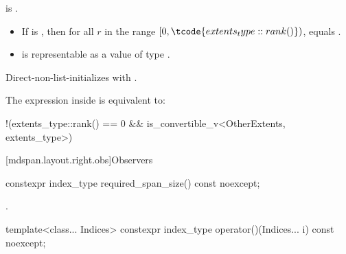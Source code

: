 \begin{itemdescr}
\pnum
\constraints
{} is .

\pnum
\expects
\begin{itemize}
\item
If  is ,
then for all $r$ in the range $[0, \tcode{extents_type::rank()})$,
 equals
.
\item
{} is representable as
a value of type .
\end{itemize}

\pnum
\effects
Direct-non-list-initializes  with .

\pnum
\remarks
The expression inside  is equivalent to:
\begin{codeblock}
!(extents_type::rank() == 0 && is_convertible_v<OtherExtents, extents_type>)
\end{codeblock}
\end{itemdescr}

[mdspan.layout.right.obs]{Observers}

%
\begin{itemdecl}
constexpr index_type required_span_size() const noexcept;
\end{itemdecl}

\begin{itemdescr}
\pnum
\returns
{}.
\end{itemdescr}

%
\begin{itemdecl}
template<class... Indices>
  constexpr index_type operator()(Indices... i) const noexcept;
\end{itemdecl}

